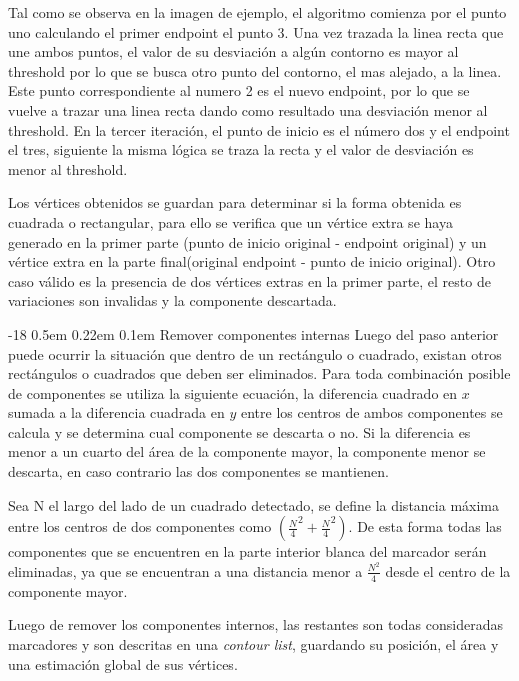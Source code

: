 \documentclass[runningheads]{llncs}
\makeatletter
\renewcommand\subsubsection{\@startsection{subsubsection}{3}{\z@}%
	{-18\p@ \@plus -4\p@ \@minus -4\p@}%
	{0.5em \@plus 0.22em \@minus 0.1em}%
	{\normalfont\normalsize\bfseries\boldmath}}
\makeatother
\begin{document}
Tal como se observa en la imagen de ejemplo, el algoritmo comienza por el punto uno calculando el primer endpoint el punto 3. Una vez trazada la linea recta que une ambos puntos, el valor de su desviación a algún contorno es mayor al threshold por lo que se busca otro punto del contorno, el mas alejado, a la linea. Este punto correspondiente al numero 2 es el nuevo endpoint, por lo que se vuelve a trazar una linea recta dando como resultado una desviación menor al threshold. En la tercer iteración, el punto de inicio es el número dos
y el endpoint el tres, siguiente la misma lógica se traza la recta y el valor de desviación es menor al threshold.

Los vértices obtenidos se guardan para determinar si la forma obtenida es cuadrada o rectangular, para ello se verifica que un vértice extra se haya generado en la primer parte (punto de inicio original - endpoint original) y un vértice extra en la parte final(original endpoint - punto de inicio original). Otro caso válido es la presencia de dos vértices extras en la primer parte, el resto de variaciones son invalidas y la componente descartada.

\subsubsection{Remover componentes internas}
Luego del paso anterior puede ocurrir la situación que dentro de un rectángulo o cuadrado, existan otros rectángulos o cuadrados que deben ser eliminados. Para toda combinación posible de componentes se utiliza la siguiente ecuación, la diferencia cuadrado en $x$ sumada a la diferencia cuadrada en $y$ entre los centros de ambos componentes se calcula y se determina cual componente se descarta o no. Si la diferencia es menor a un cuarto del área de la componente mayor, la componente menor se descarta, en caso contrario las dos componentes se mantienen.

Sea N el largo del lado de un cuadrado detectado, se define la distancia máxima entre los centros de dos componentes como $ (\frac{N}{4}^2 + \frac{N}{4}^2)$. De esta forma todas las componentes que se encuentren en la parte interior blanca del marcador serán eliminadas, ya que se encuentran a una distancia menor a $\frac{N^2}{4}$ desde el centro de la componente mayor.

Luego de remover los componentes internos, las restantes son todas consideradas marcadores y son descritas en una \textit{contour list}, guardando su posición, el área y una estimación global de sus vértices.
	
\end{document}
